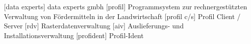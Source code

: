 \begin{acronym}\itemsep5pt
    
          [data experts]  {data experts gmbh}
       [profil]        {Programmsystem zur rechnergestützten Verwaltung von Fördermitteln in der Landwirtschaft}
          [profil c/s]    {Profil Client / Server}
          [rdv]           {Rasterdatenverwaltung}
          [aiv]           {Auslieferungs- und Installationsverwaltung}
    [profident]     {Profil-Ident}

\end{acronym}